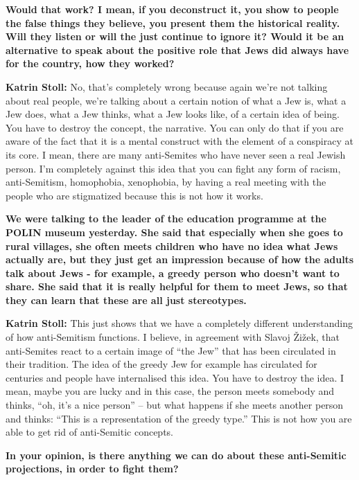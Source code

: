\textbf{Would that work? I mean, if you deconstruct it, you show to people the false things they believe, you present them the historical reality. Will they listen or will the just continue to ignore it? Would it be an alternative to speak about the positive role that Jews did always have for the country, how they worked?} 

\textbf{Katrin Stoll:} No, that’s completely wrong because again we're not talking about real people, we're talking about a certain notion of what a Jew is, what a Jew does, what a Jew thinks, what a Jew looks like, of a certain idea of being.  You have to destroy the concept, the narrative. You can only do that if you are aware of the fact that it is a mental construct with the element of a conspiracy at its core. I mean, there are many anti-Semites who have never seen a real Jewish person. I’m completely against this idea that you can fight any form of racism, anti-Semitism, homophobia, xenophobia, by having a real meeting with the people who are stigmatized because this is not how it works. 

\textbf{We were talking to the leader of the education programme at the POLIN museum yesterday. She said that especially when she goes to rural villages, she often meets children who have no idea what Jews actually are, but they just get an impression because of how the adults talk about Jews - for example, a greedy person who doesn’t want to share. She said that it is really helpful for them to meet Jews, so that they can learn that these are all just stereotypes.} 

\textbf{Katrin Stoll:} This just shows that we have a completely different understanding of how anti-Semitism functions. I believe, in agreement with Slavoj Žižek, that anti-Semites react to a certain image of ``the Jew'' that has been circulated in their tradition. The idea of the greedy Jew for example has circulated for centuries and people have internalised this idea. You have to destroy the idea. I mean, maybe you are lucky and in this case, the person meets somebody and thinks, ``oh, it’s a nice person'' – but what happens if she meets another person and thinks: ``This is a representation of the greedy type.'' This is not how you are able to get rid of anti-Semitic concepts. 

\textbf{In your opinion, is there anything we can do about these anti-Semitic projections, in order to fight them?} 

